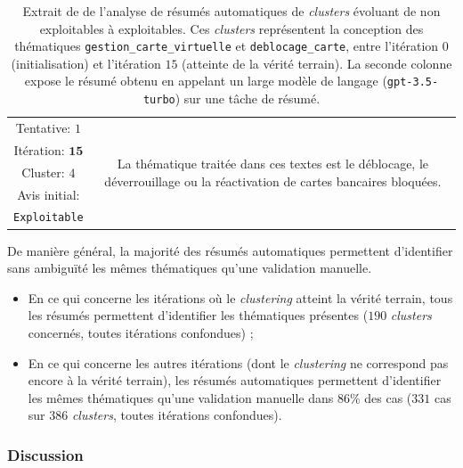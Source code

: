 \begin{table}[!htb]
\begin{center}
\begin{tabular}{|c|c|}
				{ \footnotesize Tentative: $1$ }
					& \multirow{5}{*}{\parbox{12cm}{
						\footnotesize La thématique traitée dans ces textes est le déblocage, le déverrouillage ou la réactivation de cartes bancaires bloquées.
					}}
					\tabularnewline
				{ \footnotesize Itération: $\textbf{15}$ }
					&
					\tabularnewline
				{ \footnotesize Cluster: $4$ }
					&
					\tabularnewline
				{ \footnotesize Avis initial: }
					&
					\tabularnewline
				{ \footnotesize \color{colorDarkPastelGreen} \texttt{Exploitable} }
					&
					\tabularnewline
					\hline
					
				\end{tabular}
				\end{center}
				\caption{
					Extrait de de l'analyse de résumés automatiques de \textit{clusters} évoluant de non exploitables à exploitables.
					Ces \textit{clusters} représentent la conception des thématiques \texttt{gestion\_carte\_virtuelle} et \texttt{deblocage\_carte}, entre l'itération $0$ (initialisation) et l'itération $15$ (atteinte de la vérité terrain).
					La seconde colonne expose le résumé obtenu en appelant un large modèle de langage (\texttt{gpt-3.5-turbo}) sur une tâche de résumé.
				}
				\label{table:4.4.3-ETUDE-PERTINENCE-RESUME-AUTOMATIQUE-DEBLOCAGE-CARTE-GESTION-CARTE-VIRTUELLE}
			\end{table}
			
			De manière général, la majorité des résumés automatiques permettent d'identifier sans ambiguïté les mêmes thématiques qu'une validation manuelle.
			\begin{itemize}
				\item En ce qui concerne les itérations où le \textit{clustering} atteint la vérité terrain, tous les résumés permettent d'identifier les thématiques présentes ($190$ \textit{clusters} concernés, toutes itérations confondues) ;
				\item En ce qui concerne les autres itérations (dont le \textit{clustering} ne correspond pas encore à la vérité terrain), les résumés automatiques permettent d'identifier les mêmes thématiques qu'une validation manuelle dans $86$\% des cas ($331$ cas sur $386$ \textit{clusters}, toutes itérations confondues).
			\end{itemize}
			

		\subsubsection{Discussion}
			
